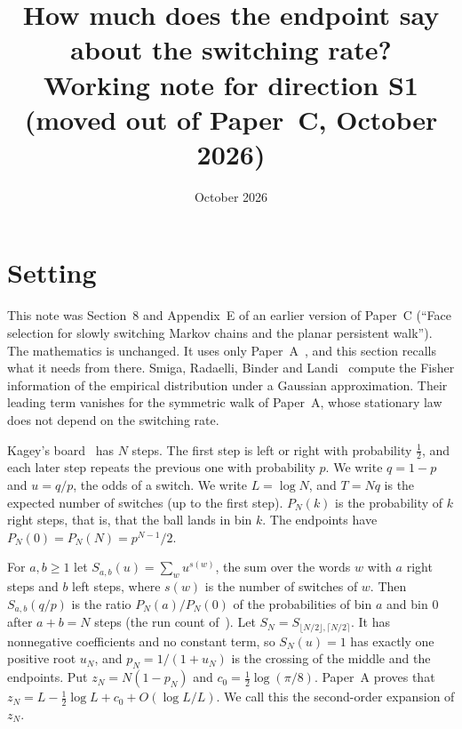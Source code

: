 \documentclass[11pt]{article}
\title{How much does the endpoint say about the switching rate?\\[4pt]
\large Working note for direction S1 (moved out of Paper~C, October 2026)}
\author{}
\date{October 2026}
\theoremstyle{definition}
\theoremstyle{remark}
\begin{document}
\maketitle

\section{Setting}\label{sec:setting}

This note was Section~8 and Appendix~E of an earlier version of Paper~C
(``Face selection for slowly switching Markov chains and the planar persistent
walk''). The mathematics is unchanged. It uses only Paper~A~\cite{paperA},
and this section recalls what it needs from there. Smiga, Radaelli, Binder and
Landi~\cite{smiga2023} compute the Fisher information of the empirical
distribution under a Gaussian approximation. Their leading term vanishes for
the symmetric walk of Paper~A, whose stationary law does not depend on the
switching rate.

Kagey's board~\cite{kagey131} has $N$ steps. The first step is left or right
with probability $\frac12$, and each later step repeats the previous one with
probability $p$. We write $q=1-p$ and $u=q/p$, the odds of a switch. We write
$L=\log N$, and $T=Nq$ is the expected number of switches (up to the first
step). $P_N(k)$ is the probability of $k$ right steps, that is, that the ball
lands in bin $k$. The endpoints have $P_N(0)=P_N(N)=p^{N-1}/2$.

For $a,b\ge1$ let $S_{a,b}(u)=\sum_wu^{s(w)}$, the sum over the words $w$ with
$a$ right steps and $b$ left steps, where $s(w)$ is the number of switches of
$w$. Then $S_{a,b}(q/p)$ is the ratio $P_N(a)/P_N(0)$ of the probabilities of
bin $a$ and bin $0$ after $a+b=N$ steps (the run count of~\cite{paperA}). Let
$S_N=S_{\lfloor N/2\rfloor,\lceil N/2\rceil}$. It has nonnegative coefficients
and no constant term, so $S_N(u)=1$ has exactly one positive root $u_N$, and
$p_N=1/(1+u_N)$ is the crossing of the middle and the endpoints. Put
$z_N=N(1-p_N)$ and $c_0=\frac12\log(\pi/8)$. Paper~A proves that
$z_N=L-\frac12\log L+c_0+O(\log L/L)$. We call this the second-order expansion
of $z_N$.



\appendix

\end{document}
